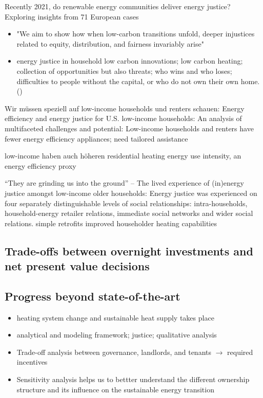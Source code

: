Recently 2021, do renewable energy communities deliver energy justice? Exploring insights from 71 European cases \cite{hanke2021renewable}

\begin{itemize}
	\item "We aim to show how when low-carbon transitions unfold, deeper injustices related to equity, distribution, and fairness invariably arise" \cite{sovacool2019decarbonization}
	\item energy justice in household low carbon innovations; low carbon heating; collection of opportunities but also threats; who wins and who loses; difficulties to people without the capital, or who do not own their own home. (\cite{sovacool2019temporality})
\end{itemize}

Wir müssen speziell auf low-income households und renters schauen: Energy efficiency and energy justice for U.S. low-income households: An analysis of multifaceted challenges and potential: Low-income households and renters have fewer energy efficiency appliances; need tailored assistance \cite{xu2019energy}

low-income haben auch höheren residential heating energy use intensity, an energy efficiency proxy \cite{reames2016targeting}

“They are grinding us into the ground” – The lived experience of (in)energy justice amongst low-income older households: Energy justice was experienced on four separately distinguishable levels of social relationships: intra-households, household-energy retailer relations, immediate social networks and wider social relations. simple retrofits improved householder heating capabilities \cite{willand2018they}

\subsection{Trade-offs between overnight investments and net present value decisions}

\subsection{Progress beyond state-of-the-art}
\begin{itemize}
	\item heating system change and sustainable heat supply takes place
	\item analytical and modeling framework; justice; qualitative analysis
	\item Trade-off analysis between governance, landlords, and tenants $\longrightarrow$ required incentives
	\item Sensitivity analysis helps us to bettter understand the different ownership structure and its influence on the sustainable energy transition
\end{itemize}